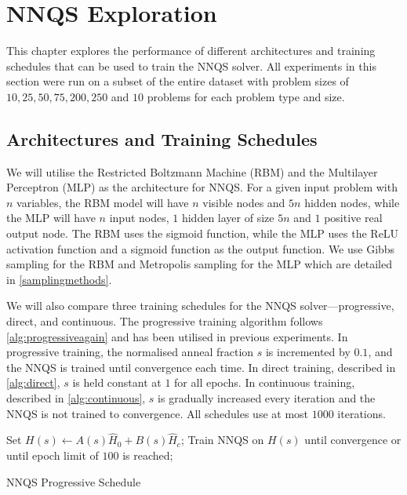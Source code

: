 \chapter{NNQS Exploration}\label{nnqsresults}
This chapter explores the performance of different architectures and training schedules that can be used to train the NNQS solver. All experiments in this section were run on a subset of the entire dataset with problem sizes of $10,25,50,75,200,250$ and $10$ problems for each problem type and size. 


\section{Architectures and Training Schedules}
We will utilise the Restricted Boltzmann Machine (RBM) and the Multilayer Perceptron (MLP) as the architecture for NNQS. For a given input problem with $n$ variables, the RBM model will have $n$ visible nodes and $5n$ hidden nodes, while the MLP will have $n$ input nodes, $1$ hidden layer of size $5n$ and $1$ positive real output node. The RBM uses the sigmoid function, while the MLP uses the ReLU activation function and a sigmoid function as the output function. We use Gibbs sampling for the RBM and Metropolis sampling for the MLP which are detailed in \autoref{samplingmethods}.

We will also compare three training schedules for the NNQS solver---progressive, direct, and continuous. The progressive training algorithm follows \autoref{alg:progressiveagain} and has been utilised in previous experiments. In progressive training, the normalised anneal fraction $s$ is incremented by $0.1$, and the NNQS is trained until convergence each time. In direct training, described in \autoref{alg:direct}, $s$ is held constant at $1$ for all epochs. In continuous training, described in \autoref{alg:continuous}, $s$ is gradually increased every iteration and the NNQS is not trained to convergence. All schedules use at most $1000$ iterations.

\begin{algorithm}
    \begin{algorithmic}
    \State Set $H(s) \leftarrow A(s)\hat{H}_0 + B(s)\hat{H}_c$;
    \State Train NNQS on $H(s)$ until convergence or until epoch limit of $100$ is reached;
    \EndFor
    \end{algorithmic}
    \caption{NNQS Progressive Schedule}
    \label{alg:progressiveagain}
\end{algorithm}

